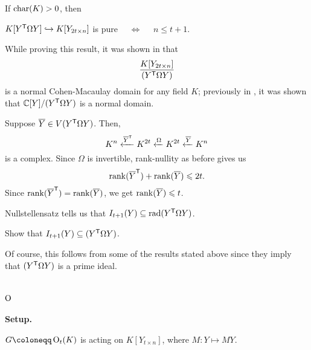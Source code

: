 \documentclass[12pt]{article}
\begin{document}
\begin{thm}
	If $\operatorname{char}(K) > 0$, then
	\begin{center} 
		$K[Y^{\mathsf{T}} \Omega Y] \hookrightarrow K[Y_{2t \times n}]$ is pure $\quad\Leftrightarrow\quad$ $n \le t + 1$.
	\end{center}
\end{thm}

While proving this result, it was shown in \cite[Theorem 6.8]{HochsterJeffriesPandeySingh} that
\begin{equation*} 
	\dfrac{K[Y_{2t \times n}]}{(Y^{\mathsf{T}} \Omega Y)}
\end{equation*}
is a normal Cohen-Macaulay domain for any field $K$; previously in \cite{KraftSchwarz}, it was shown that $\mathbb{C}[Y]/(Y^{\mathsf{T}} \Omega Y)$ is a normal domain. 

\begin{fakerem}
	Suppose $\overline{Y} \in V(Y^{\mathsf{T}} \Omega Y)$. Then,
	\begin{equation*} 
		\text{$K^{n} \xleftarrow{\overline{Y}^{\mathsf{T}}} K^{2t}$} \xleftarrow{\Omega} K^{2t} \xleftarrow{\overline{Y}} K^{n}
	\end{equation*}
	is a complex. Since $\Omega$ is invertible, rank-nullity as before gives us
	\begin{equation*} 
		\operatorname{rank}(\overline{Y}^{\mathsf{T}}) + \operatorname{rank}(\overline{Y}) \leqslant 2t.
	\end{equation*}
	Since $\operatorname{rank}(\overline{Y}^{\mathsf{T}}) = \operatorname{rank}(\overline{Y})$, we get $\operatorname{rank}(\overline{Y}) \leqslant t$.

	Nullstellensatz tells us that $I_{t + 1}(Y) \subseteq \operatorname{rad}(Y^{\mathsf{T}} \Omega Y)$.
\end{fakerem}

\begin{exe}
	Show that $I_{t + 1}(Y) \subseteq (Y^{\mathsf{T}} \Omega Y)$. 
\end{exe}
Of course, this follows from some of the results stated above since they imply that $(Y^{\mathsf{T}} \Omega Y)$ is a prime ideal.

\section{\texorpdfstring{$\operatorname{O}$}{O}}

\begin{tcolorbox}[parbox=false]
	\textbf{Setup.} 

	$G \coloneqq \OO_{t}(K)$ is acting on $K[Y_{t \times n}]$, where $M : Y \mapsto MY$.
\end{tcolorbox}
\end{document}
